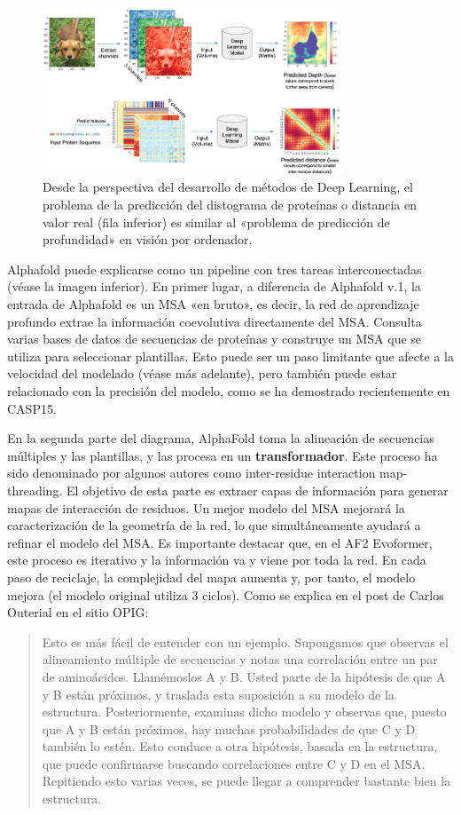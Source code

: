 \begin{figure}[h]
\centering
\includegraphics[width = 0.8\textwidth]{figs/machine_fold.png}
\caption{Desde la perspectiva del desarrollo de métodos de Deep Learning, el problema de la predicción del distograma de proteínas o distancia en valor real (fila inferior) es similar al «problema de predicción de profundidad» en visión por ordenador.}
\end{figure}

Alphafold puede explicarse como un pipeline con tres tareas interconectadas (véase la imagen inferior). En primer lugar, a diferencia de Alphafold v.1, la entrada de Alphafold es un MSA «en bruto», es decir, la red de aprendizaje profundo extrae la información coevolutiva directamente del MSA. Consulta varias bases de datos de secuencias de proteínas y construye un MSA que se utiliza para seleccionar plantillas. Esto puede ser un paso limitante que afecte a la velocidad del modelado (véase más adelante), pero también puede estar relacionado con la precisión del modelo, como se ha demostrado recientemente en CASP15.

En la segunda parte del diagrama, AlphaFold toma la alineación de secuencias múltiples y las plantillas, y las procesa en un \textbf{transformador}. Este proceso ha sido denominado por algunos autores como inter-residue interaction map-threading. El objetivo de esta parte es extraer capas de información para generar mapas de interacción de residuos. Un mejor modelo del MSA mejorará la caracterización de la geometría de la red, lo que simultáneamente ayudará a refinar el modelo del MSA. Es importante destacar que, en el AF2 Evoformer, este proceso es iterativo y la información va y viene por toda la red. En cada paso de reciclaje, la complejidad del mapa aumenta y, por tanto, el modelo mejora (el modelo original utiliza 3 ciclos). Como se explica en el post de Carlos Outerial en el sitio OPIG:
\begin{quote}
Esto es más fácil de entender con un ejemplo. Supongamos que observas el alineamiento múltiple de secuencias y notas una correlación entre un par de aminoácidos. Llamémoslos A y B. Usted parte de la hipótesis de que A y B están próximos, y traslada esta suposición a su modelo de la estructura. Posteriormente, examinas dicho modelo y observas que, puesto que A y B están próximos, hay muchas probabilidades de que C y D también lo estén. Esto conduce a otra hipótesis, basada en la estructura, que puede confirmarse buscando correlaciones entre C y D en el MSA. Repitiendo esto varias veces, se puede llegar a comprender bastante bien la estructura.
\end{quote}

